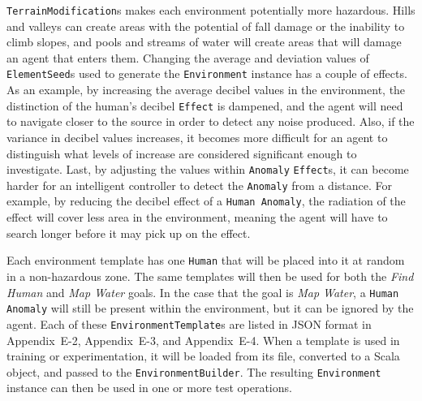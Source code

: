 \noindent
\texttt{TerrainModification}s makes each environment potentially more hazardous.
Hills and valleys can create areas with the potential of fall damage or the inability to climb slopes, and pools and streams of water will create areas that will damage an agent that enters them.
Changing the average and deviation values of \texttt{ElementSeed}s used to generate the \texttt{Environment} instance has a couple of effects.
As an example, by increasing the average decibel values in the environment, the distinction of the human's decibel \texttt{Effect} is dampened, and the agent will need to navigate closer to the source in order to detect any noise produced.
Also, if the variance in decibel values increases, it becomes more difficult for an agent to distinguish what levels of increase are considered significant enough to investigate.
Last, by adjusting the values within \texttt{Anomaly} \texttt{Effect}s, it can become harder for an intelligent controller to detect the \texttt{Anomaly} from a distance.
For example, by reducing the decibel effect of a \texttt{Human Anomaly}, the radiation of the effect will cover less area in the environment, meaning the agent will have to search longer before it may pick up on the effect.

Each environment template has one \texttt{Human} that will be placed into it at random in a non-hazardous zone.
The same templates will then be used for both the \textit{Find Human} and \textit{Map Water} goals.
In the case that the goal is \textit{Map Water}, a \texttt{Human Anomaly} will still be present within the environment, but it can be ignored by the agent.
Each of these \texttt{EnvironmentTemplate}s are listed in JSON format in Appendix~E-2, Appendix~E-3, and Appendix~E-4.
When a template is used in training or experimentation, it will be loaded from its file, converted to a Scala object, and passed to the \texttt{EnvironmentBuilder}.
The resulting \texttt{Environment} instance can then be used in one or more test operations.


